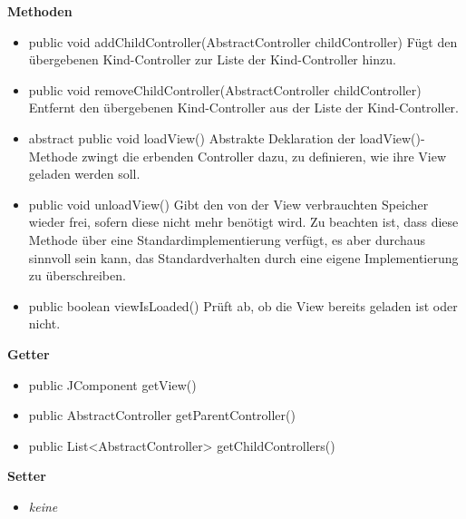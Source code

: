 \documentclass{article}
\begin{document}
      \textbf{Methoden}
      \begin{itemize}
        \item public void addChildController(AbstractController childController) \newline
          Fügt den übergebenen Kind-Controller zur Liste der Kind-Controller hinzu.
        
        \item public void removeChildController(AbstractController childController) \newline
          Entfernt den übergebenen Kind-Controller aus der Liste der Kind-Controller.
          
        \item abstract public void loadView() \newline
          Abstrakte Deklaration der loadView()-Methode zwingt die erbenden Controller dazu,
          zu definieren, wie ihre View geladen werden soll.
          
        \item public void unloadView() \newline
          Gibt den von der View verbrauchten Speicher wieder frei, sofern diese nicht mehr
          benötigt wird. Zu beachten ist, dass diese Methode über eine Standardimplementierung
          verfügt, es aber durchaus sinnvoll sein kann, das Standardverhalten durch eine
          eigene Implementierung zu überschreiben.
        
        \item public boolean viewIsLoaded() \newline
          Prüft ab, ob die View bereits geladen ist oder nicht.
      \end{itemize}
      
      \textbf{Getter}
      \begin{itemize}
        \item public JComponent getView()
        \item public AbstractController getParentController()
        \item public List<AbstractController> getChildControllers()
      \end{itemize}
      
      \textbf{Setter}
      \begin{itemize}
        \item \textit{keine}
      \end{itemize}
	
\end{document}

